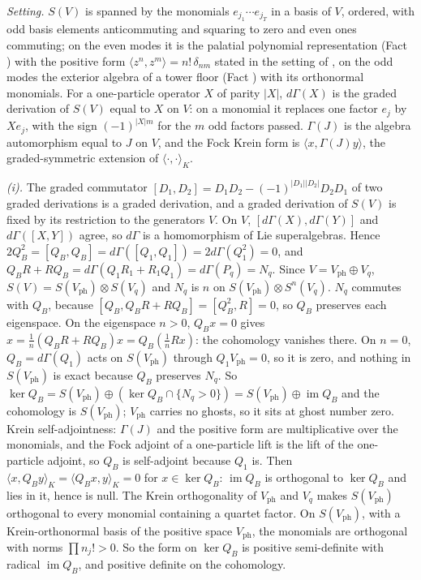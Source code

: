 \emph{Setting.} $S(V)$ is spanned by the monomials $e_{j_1}\cdots e_{j_T}$ in a basis of $V$, ordered, with odd basis elements anticommuting and squaring to zero and even ones commuting; on the even modes it is the palatial polynomial representation (Fact ) with the positive form $\langle z^n, z^m\rangle = n!\,\delta_{nm}$ stated in the setting of , on the odd modes the exterior algebra of a tower floor (Fact ) with its orthonormal monomials. For a one-particle operator $X$ of parity $|X|$, $d\Gamma(X)$ is the graded derivation of $S(V)$ equal to $X$ on $V$: on a monomial it replaces one factor $e_{j}$ by $Xe_{j}$, with the sign $(-1)^{|X|m}$ for the $m$ odd factors passed. $\Gamma(J)$ is the algebra automorphism equal to $J$ on $V$, and the Fock Krein form is $\langle x, \Gamma(J)y\rangle$, the graded-symmetric extension of $\langle\cdot,\cdot\rangle_K$.

\emph{(i).} The graded commutator $[D_1, D_2] = D_1D_2 - (-1)^{|D_1||D_2|}D_2D_1$ of two graded derivations is a graded derivation, and a graded derivation of $S(V)$ is fixed by its restriction to the generators $V$. On $V$, $[d\Gamma(X), d\Gamma(Y)]$ and $d\Gamma([X, Y])$ agree, so $d\Gamma$ is a homomorphism of Lie superalgebras. Hence $2Q_{B}^2 = [Q_{B}, Q_{B}] = d\Gamma([Q_1, Q_1]) = 2d\Gamma(Q_1^2) = 0$, and $Q_{B}R + RQ_{B} = d\Gamma(Q_1R_1 + R_1Q_1) = d\Gamma(P_{q}) = N_{q}$. Since $V = V_{\mathrm{ph}} \oplus V_{q}$, $S(V) = S(V_{\mathrm{ph}}) \otimes S(V_{q})$ and $N_{q}$ is $n$ on $S(V_{\mathrm{ph}}) \otimes S^{n}(V_{q})$. $N_{q}$ commutes with $Q_{B}$, because $[Q_{B}, Q_{B}R + RQ_{B}] = [Q_{B}^2, R] = 0$, so $Q_{B}$ preserves each eigenspace. On the eigenspace $n > 0$, $Q_{B}x = 0$ gives $x = \tfrac1n(Q_{B}R + RQ_{B})x = Q_{B}(\tfrac1nRx)$: the cohomology vanishes there. On $n = 0$, $Q_{B} = d\Gamma(Q_1)$ acts on $S(V_{\mathrm{ph}})$ through $Q_1V_{\mathrm{ph}} = 0$, so it is zero, and nothing in $S(V_{\mathrm{ph}})$ is exact because $Q_{B}$ preserves $N_{q}$. So $\ker Q_{B} = S(V_{\mathrm{ph}}) \oplus (\ker Q_{B} \cap \{N_{q} > 0\}) = S(V_{\mathrm{ph}}) \oplus \operatorname{im}Q_{B}$ and the cohomology is $S(V_{\mathrm{ph}})$; $V_{\mathrm{ph}}$ carries no ghosts, so it sits at ghost number zero. Krein self-adjointness: $\Gamma(J)$ and the positive form are multiplicative over the monomials, and the Fock adjoint of a one-particle lift is the lift of the one-particle adjoint, so $Q_{B}$ is self-adjoint because $Q_1$ is. Then $\langle x, Q_{B}y\rangle_K = \langle Q_{B}x, y\rangle_K = 0$ for $x \in \ker Q_{B}$: $\operatorname{im}Q_{B}$ is orthogonal to $\ker Q_{B}$ and lies in it, hence is null. The Krein orthogonality of $V_{\mathrm{ph}}$ and $V_{q}$ makes $S(V_{\mathrm{ph}})$ orthogonal to every monomial containing a quartet factor. On $S(V_{\mathrm{ph}})$, with a Krein-orthonormal basis of the positive space $V_{\mathrm{ph}}$, the monomials are orthogonal with norms $\prod n_j! > 0$. So the form on $\ker Q_{B}$ is positive semi-definite with radical $\operatorname{im}Q_{B}$, and positive definite on the cohomology.

